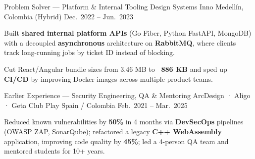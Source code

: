 \begin{cventries}
  \cventry
  {Problem Solver — Platform \& Internal Tooling}
  {Design Systems Inno}
  {Medellín, Colombia (Hybrid)}
  {Dec.\ 2022 -- Jun.\ 2023}
  {
    \begin{cvitems}
      \item {Built \textbf{shared internal platform APIs} (Go Fiber, Python FastAPI, MongoDB) with a decoupled \textbf{asynchronous} architecture on \textbf{RabbitMQ}, where clients track long-running jobs by ticket ID instead of blocking.}
      \item {Cut React/Angular bundle sizes from 3.46 MB to \textbf{~886 KB} and sped up \textbf{CI/CD} by improving Docker images across multiple product teams.}
    \end{cvitems}
  }

  \cventry
  {Earlier Experience --- Security Engineering, QA \& Mentoring}
  {ArcDesign · Aligo · Geta Club Play}
  {Spain / Colombia}
  {Feb.\ 2021 -- Mar.\ 2025}
  {
    \begin{cvitems}
      \item {Reduced known vulnerabilities by \textbf{50\%} in 4 months via \textbf{DevSecOps} pipelines (OWASP ZAP, SonarQube); refactored a legacy \textbf{C++ WebAssembly} application, improving code quality by \textbf{45\%}; led a 4-person QA team and mentored students for 10+ years.}
    \end{cvitems}
  }

\end{cventries}
